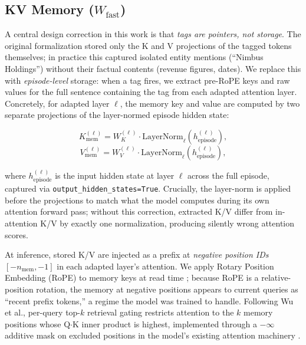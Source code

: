 \subsection{KV Memory ($W_{\mathrm{fast}}$)}
\label{sec:kv_memory}

A central design correction in this work is that \emph{tags are pointers, not storage}. The original formalization stored only the K and V projections of the tagged tokens themselves; in practice this captured isolated entity mentions (``Nimbus Holdings'') without their factual contents (revenue figures, dates). We replace this with \emph{episode-level} storage: when a tag fires, we extract pre-RoPE keys and raw values for the full sentence containing the tag from each adapted attention layer. Concretely, for adapted layer $\ell$, the memory key and value are computed by two separate projections of the layer-normed episode hidden state:

\begin{equation}
\label{eq:kmem}
K^{(\ell)}_{\mathrm{mem}} = W^{(\ell)}_K \cdot \mathrm{LayerNorm}_\ell\!\left(h^{(\ell)}_{\mathrm{episode}}\right),
\end{equation}
\begin{equation}
\label{eq:vmem}
V^{(\ell)}_{\mathrm{mem}} = W^{(\ell)}_V \cdot \mathrm{LayerNorm}_\ell\!\left(h^{(\ell)}_{\mathrm{episode}}\right),
\end{equation}

where $h^{(\ell)}_{\mathrm{episode}}$ is the input hidden state at layer $\ell$ across the full episode, captured via \texttt{output\_hidden\_states=True}. Crucially, the layer-norm is applied before the projections to match what the model computes during its own attention forward pass; without this correction, extracted K/V differ from in-attention K/V by exactly one normalization, producing silently wrong attention scores.

At inference, stored K/V are injected as a prefix at \emph{negative position IDs} $[-n_\mathrm{mem}, -1]$ in each adapted layer's attention. We apply Rotary Position Embedding (RoPE) to memory keys at read time \citep{su2024roformer}; because RoPE is a relative-position rotation, the memory at negative positions appears to current queries as ``recent prefix tokens,'' a regime the model was trained to handle. Following Wu et al., per-query top-$k$ retrieval gating restricts attention to the $k$ memory positions whose Q$\cdot$K inner product is highest, implemented through a $-\infty$ additive mask on excluded positions in the model's existing attention machinery \citep{wu2022memorizing}.

